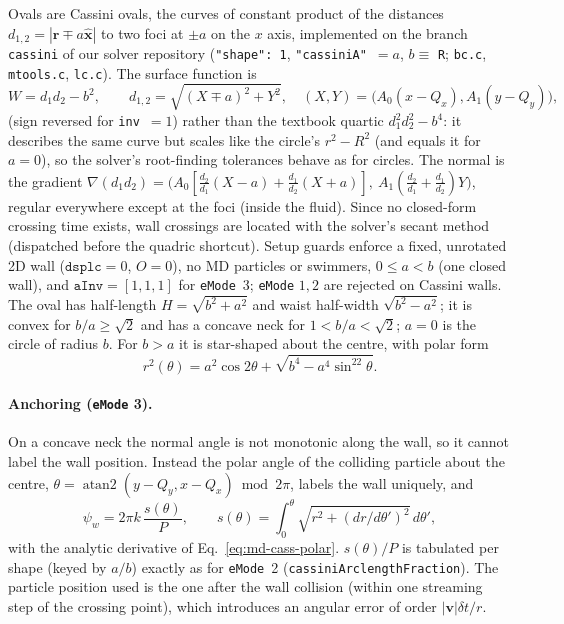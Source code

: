Ovals are Cassini ovals, the curves of constant product of the distances $d_{1,2}=|\mathbf r\mp a\hat{\mathbf x}|$
to two foci at $\pm a$ on the $x$ axis, implemented on the branch \texttt{cassini} of our solver repository
(\texttt{"shape": 1}, \texttt{"cassiniA"}~$=a$, $b\equiv$ \texttt{R}; \texttt{bc.c}, \texttt{mtools.c},
\texttt{lc.c}). The surface function is
\begin{equation}
  W=d_1d_2-b^2,\qquad d_{1,2}=\sqrt{(X\mp a)^2+Y^2},\quad (X,Y)=\big(A_0(x-Q_x),A_1(y-Q_y)\big),
  \label{eq:md-cassW}
\end{equation}
(sign reversed for \texttt{inv}~$=1$) rather than the textbook quartic $d_1^2d_2^2-b^4$: it describes the same
curve but scales like the circle's $r^2-R^2$ (and equals it for $a=0$), so the solver's root-finding tolerances
behave as for circles. The normal is the gradient
$\nabla(d_1d_2)=\big(A_0[\tfrac{d_2}{d_1}(X-a)+\tfrac{d_1}{d_2}(X+a)],\ A_1(\tfrac{d_2}{d_1}+\tfrac{d_1}{d_2})Y\big)$,
regular everywhere except at the foci (inside the fluid). Since no closed-form crossing time exists, wall crossings
are located with the solver's secant method (dispatched before the quadric shortcut). Setup guards enforce a fixed,
unrotated 2D wall ($\texttt{dsplc}=0$, $O=0$), no MD particles or swimmers, $0\le a<b$ (one closed wall),
and $\texttt{aInv}=[1,1,1]$ for \texttt{eMode}~3; \texttt{eMode} $1,2$ are rejected on Cassini walls. The oval
has half-length $H=\sqrt{b^2+a^2}$ and waist half-width $\sqrt{b^2-a^2}$; it is convex for $b/a\ge\sqrt2$ and has a
concave neck for $1<b/a<\sqrt2$; $a=0$ is the circle of radius $b$. For $b>a$ it is star-shaped about the centre,
with polar form
\begin{equation}
  r^2(\theta)=a^2\cos2\theta+\sqrt{b^4-a^4\sin^22\theta}.
  \label{eq:md-cass-polar}
\end{equation}

\paragraph{Anchoring (\texttt{eMode} 3).} On a concave neck the normal angle is not monotonic along the wall,
so it cannot label the wall position. Instead the polar angle of the colliding particle about the centre,
$\theta=\operatorname{atan2}(y-Q_y,x-Q_x)\bmod2\pi$, labels the wall uniquely, and
\begin{equation}
  \psi_w=2\pi k\,\frac{s(\theta)}{P},\qquad s(\theta)=\int_0^\theta\sqrt{r^2+(dr/d\theta')^2}\,d\theta' ,
  \label{eq:md-emode3}
\end{equation}
with the analytic derivative of Eq.~\eqref{eq:md-cass-polar}. $s(\theta)/P$ is tabulated per shape (keyed by
$a/b$) exactly as for \texttt{eMode}~2 (\texttt{cassiniArclengthFraction}). The particle position used is the one
after the wall collision (within one streaming step of the crossing point), which introduces an angular error of
order $|\mathbf v|\delta t/r$.

